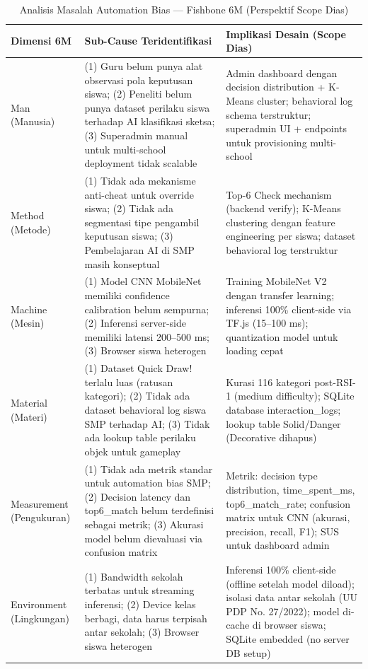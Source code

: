 \documentclass[12pt,a4paper,oneside,openany]{report}
\begin{document}
\begin{table}[H]
\centering
\caption{Analisis Masalah Automation Bias --- Fishbone 6M (Perspektif Scope Dias)}
\label{tab:fishbone-6m}
\begin{tabular}{|p{2.5cm}|p{5cm}|p{6cm}|}
\hline
\textbf{Dimensi 6M} & \textbf{Sub-Cause Teridentifikasi} & \textbf{Implikasi Desain (Scope Dias)} \\ \hline
Man (Manusia) & (1) Guru belum punya alat observasi pola keputusan siswa; (2) Peneliti belum punya dataset perilaku siswa terhadap AI klasifikasi sketsa; (3) Superadmin manual untuk multi-school deployment tidak scalable & Admin dashboard dengan decision distribution + K-Means cluster; behavioral log schema terstruktur; superadmin UI + endpoints untuk provisioning multi-school \\ \hline
Method (Metode) & (1) Tidak ada mekanisme anti-cheat untuk override siswa; (2) Tidak ada segmentasi tipe pengambil keputusan siswa; (3) Pembelajaran AI di SMP masih konseptual & Top-6 Check mechanism (backend verify); K-Means clustering dengan feature engineering per siswa; dataset behavioral log terstruktur \\ \hline
Machine (Mesin) & (1) Model CNN MobileNet memiliki confidence calibration belum sempurna; (2) Inferensi server-side memiliki latensi 200--500 ms; (3) Browser siswa heterogen & Training MobileNet V2 dengan transfer learning; inferensi 100\% client-side via TF.js (15--100 ms); quantization model untuk loading cepat \\ \hline
Material (Materi) & (1) Dataset Quick Draw! terlalu luas (ratusan kategori); (2) Tidak ada dataset behavioral log siswa SMP terhadap AI; (3) Tidak ada lookup table perilaku objek untuk gameplay & Kurasi 116 kategori post-RSI-1 (medium difficulty); SQLite database interaction\_logs; lookup table Solid/Danger (Decorative dihapus) \\ \hline
Measurement (Pengukuran) & (1) Tidak ada metrik standar untuk automation bias SMP; (2) Decision latency dan top6\_match belum terdefinisi sebagai metrik; (3) Akurasi model belum dievaluasi via confusion matrix & Metrik: decision type distribution, time\_spent\_ms, top6\_match\_rate; confusion matrix untuk CNN (akurasi, precision, recall, F1); SUS untuk dashboard admin \\ \hline
Environment (Lingkungan) & (1) Bandwidth sekolah terbatas untuk streaming inferensi; (2) Device kelas berbagi, data harus terpisah antar sekolah; (3) Browser siswa heterogen & Inferensi 100\% client-side (offline setelah model diload); isolasi data antar sekolah (UU PDP No. 27/2022); model di-cache di browser siswa; SQLite embedded (no server DB setup) \\ \hline
\end{tabular}
\end{table}
\end{document}
